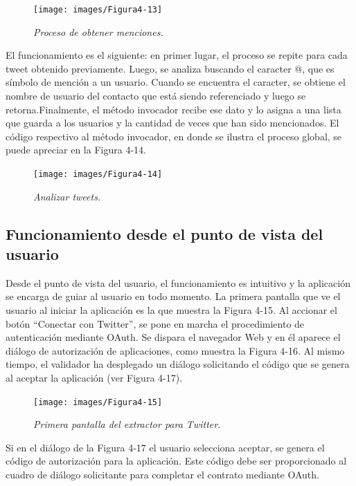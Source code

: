 \begin{figure}[H]
	\centering
	\texttt{[image: images/Figura4-13]}
	\caption{\em Proceso de obtener menciones.}
	\label{fig:ext-im13}
\end{figure}

El funcionamiento es el siguiente: en primer lugar, el proceso se repite para cada tweet obtenido previamente. Luego, se analiza buscando el caracter @, que es símbolo de mención a un usuario. Cuando se encuentra el caracter, se obtiene el nombre de usuario del contacto que está siendo referenciado y luego se retorna.Finalmente, el método invocador recibe ese dato y lo asigna a una lista que guarda a los usuarios y la cantidad de veces que han sido mencionados. El código respectivo al método invocador, en donde se ilustra el proceso global, se puede apreciar en la Figura 4-14.

\begin{figure}[H]
	\centering
	\texttt{[image: images/Figura4-14]}
	\caption{\em Analizar tweets.}
	\label{fig:ext-im14}
\end{figure}



\subsection{Funcionamiento desde el punto de vista del usuario}

Desde el punto de vista del usuario, el funcionamiento es intuitivo y la aplicación se encarga de guiar al usuario en todo momento. La primera pantalla que ve el usuario al iniciar la aplicación es la que muestra la Figura 4-15. Al accionar el botón “Conectar con Twitter”, se pone en marcha el procedimiento de autenticación mediante OAuth. Se dispara el navegador Web y en él aparece el diálogo de autorización de aplicaciones, como muestra la Figura 4-16. Al mismo tiempo, el validador ha desplegado un diálogo solicitando el código que se genera al aceptar la aplicación (ver Figura 4-17).

\begin{figure}[H]
	\centering
	\texttt{[image: images/Figura4-15]}
	\caption{\em Primera pantalla del extractor para Twitter.}
	\label{fig:ext-im15}
\end{figure}

Si en el diálogo de la Figura 4-17 el usuario selecciona aceptar, se genera el código de autorización para la aplicación. Este código debe ser proporcionado al cuadro de diálogo solicitante para completar el contrato mediante OAuth. 


